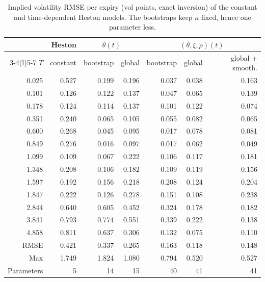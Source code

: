 \documentclass[11pt,a4paper]{article}
\theoremstyle{plain}
\theoremstyle{definition}
\begin{document}
\begin{table}[htbp]
\centering
\small
\begin{tabular}{@{}rrrrrrr@{}}
\toprule
 & Heston & \multicolumn{2}{c}{$\theta(t)$} & \multicolumn{3}{c}{$(\theta,\xi,\rho)(t)$} \\
\cmidrule(lr){3-4}\cmidrule(l){5-7}
$T$ & constant & bootstrap & global & bootstrap & global & global + smooth. \\
\midrule
0.025 & 0.527 & 0.199 & 0.196 & 0.037 & 0.038 & 0.163 \\
0.101 & 0.126 & 0.122 & 0.137 & 0.047 & 0.065 & 0.139 \\
0.178 & 0.124 & 0.114 & 0.137 & 0.101 & 0.122 & 0.074 \\
0.351 & 0.240 & 0.065 & 0.105 & 0.055 & 0.082 & 0.065 \\
0.600 & 0.268 & 0.045 & 0.095 & 0.017 & 0.078 & 0.081 \\
0.849 & 0.276 & 0.016 & 0.097 & 0.017 & 0.062 & 0.049 \\
1.099 & 0.109 & 0.067 & 0.222 & 0.106 & 0.117 & 0.181 \\
1.348 & 0.208 & 0.106 & 0.182 & 0.109 & 0.119 & 0.156 \\
1.597 & 0.192 & 0.156 & 0.218 & 0.208 & 0.124 & 0.204 \\
1.847 & 0.222 & 0.126 & 0.278 & 0.151 & 0.108 & 0.238 \\
2.844 & 0.640 & 0.605 & 0.452 & 0.324 & 0.178 & 0.182 \\
3.841 & 0.793 & 0.774 & 0.551 & 0.339 & 0.222 & 0.138 \\
4.858 & 0.811 & 0.637 & 0.306 & 0.132 & 0.075 & 0.110 \\
\midrule
RMSE & 0.421 & 0.337 & 0.265 & 0.163 & 0.118 & 0.148 \\
Max & 1.749 & 1.824 & 1.080 & 0.794 & 0.520 & 0.527 \\
Parameters & 5 & 14 & 15 & 40 & 41 & 41 \\
\bottomrule
\end{tabular}
\caption{Implied volatility RMSE per expiry (vol points, exact inversion) of the constant and time-dependent Heston models. The bootstraps keep $\kappa$ fixed, hence one parameter less.}
\label{tab:td_errors}
\end{table}
\end{document}
